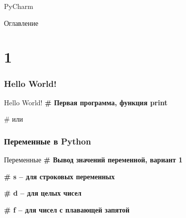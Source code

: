 \documentclass[12pt]{beamer}
\begin{document}
\begin{frame}{PyCharm}
 \\
\href{https://www.jetbrains.com/pycharm/}{}
\end{frame}


\begin{frame}[t]{Оглавление}
\tableofcontents[part=1]
\end{frame}


\part{1}
\section{Hello World!}
\begin{frame}{Hello World!}
\textbf{\# Первая программа, функция print}

\vspace{0.5cm}
\# или

\end{frame}


\section{Переменные в Python}
\begin{frame}{Переменные}
\textbf{\# Вывод значений переменной, вариант 1}

\vspace{0.5cm}
\textbf{\# s -- для строковых переменных}

\textbf{\# d -- для целых чисел}\

\textbf{\# f -- для чисел с плавающей запятой}
\end{frame}
\end{document}
